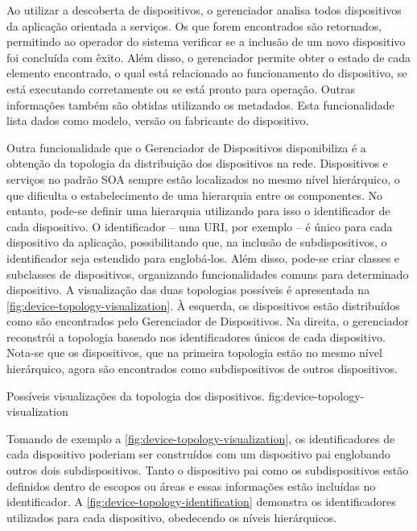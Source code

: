 Ao utilizar a descoberta de dispositivos, o gerenciador analisa todos dispositivos da aplicação
orientada a serviços. Os que forem encontrados são retornados, permitindo ao operador do sistema
verificar se a inclusão de um novo dispositivo foi concluída com êxito. Além disso, o gerenciador
permite obter o estado de cada elemento encontrado, o qual está relacionado ao funcionamento do
dispositivo, se está executando corretamente ou se está pronto para operação. Outras informações
também são obtidas utilizando os metadados. Esta funcionalidade lista dados como modelo, versão ou
fabricante do dispositivo.

Outra funcionalidade que o Gerenciador de Dispositivos disponibiliza é a obtenção da topologia da
distribuição dos dispositivos na rede. Dispositivos e serviços no padrão \gls{SOA} sempre estão
localizados no mesmo nível hierárquico, o que dificulta o estabelecimento de uma hierarquia entre os
componentes. No entanto, pode-se definir uma hierarquia utilizando para isso o identificador de cada
dispositivo. O identificador -- uma \gls{URI}, por exemplo -- é único para cada dispositivo da
aplicação, possibilitando que, na inclusão de subdispositivos, o identificador seja estendido para
englobá-los. Além disso, pode-se criar classes e subclasses de dispositivos, organizando
funcionalidades comuns para determinado dispositivo. A visualização das duas topologias possíveis é
apresentada na \cref{fig:device-topology-visualization}. À esquerda, os dispositivos estão
distribuídos como são encontrados pelo Gerenciador de Dispositivos. Na direita, o gerenciador
reconstrói a topologia baseado nos identificadores únicos de cada dispositivo. Nota-se que os
dispositivos, que na primeira topologia estão no mesmo nível hierárquico, agora são encontrados como
subdispositivos de outros dispositivos.

  {Possíveis visualizações da topologia dos dispositivos.}
  {fig:device-topology-visualization}

Tomando de exemplo a \cref{fig:device-topology-visualization}, os identificadores de cada
dispositivo poderiam ser construídos com um dispositivo pai englobando outros dois subdispositivos.
Tanto o dispositivo pai como os subdispositivos estão definidos dentro de escopos ou áreas e essas
informações estão incluídas no identificador. A \cref{fig:device-topology-identification} demonstra
os identificadores utilizados para cada dispositivo, obedecendo os níveis hierárquicos.

